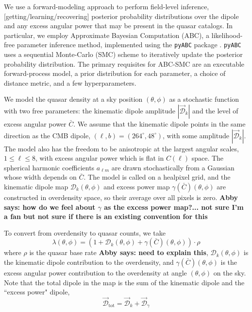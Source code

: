 \documentclass[modern]{aastex631}
\newcommand{\abby}[1]{\textbf{Abby says: #1}}
\newcommand{\dipamp}{|\vec{\mathcal{D}}_k|}
\begin{document}
We use a forward-modeling approach to perform field-level inference, [getting/learning/recovering] posterior probability distributions over the dipole and any excess angular power that may be present in the quasar catalogs.
In particular, we employ Approximate Bayesian Computation (ABC), a likelihood-free parameter inference method, implemented using the \texttt{pyABC} package \citep{schalte_pyabc_2022}.
\texttt{pyABC} uses a sequential Monte-Carlo (SMC) scheme to iteratively update the posterior probability distribution.
The primary requisites for ABC-SMC are an executable forward-process model, a prior distribution for each parameter, a choice of distance metric, and a few hyperparameters.

We model the quasar density at a sky position $(\theta,\phi)$ as a stochastic function with two free parameters: the kinematic dipole amplitude $\dipamp$ and the level of excess angular power $\bar C$.
We assume that the kinematic dipole points in the same direction as the CMB dipole, $(\ell,b)=(264^\circ,48^\circ)$, with some amplitude $|\vec{\mathcal{D}}_k|$.
The model also has the freedom to be anisotropic at the largest angular scales, $1\le\ell\le 8$, with excess angular power which is flat in $C(\ell)$ space.
The spherical harmonic coefficients $a_{\ell m}$ are drawn stochastically from a Gaussian whose width depends on $\bar C$.
The model is called on a healpixel grid, and the kinematic dipole map $\mathcal{D}_k(\theta,\phi)$ and excess power map $\gamma(\bar C)(\theta,\phi)$ are constructed in overdensity space, so their average over all pixels is zero.
\abby{how do we feel about $\gamma$ as the excess power map?... not sure I'm a fan but not sure if there is an existing convention for this}

To convert from overdensity to quasar counts, we take
\begin{equation}
    \lambda(\theta,\phi) = (1 + \mathcal{D}_k(\theta,\phi) + \gamma(\bar C)(\theta, \phi)) \cdot \rho
\end{equation}
where $\rho$ is the quasar base rate \abby{need to explain this}, $\mathcal{D}_k(\theta,\phi)$ is the kinematic dipole contribution to the overdensity, and $\gamma(\bar C)(\theta,\phi)$ is the excess angular power contribution to the overdensity at angle $(\theta,\phi)$ on the sky.
Note that the total dipole in the map is the sum of the kinematic dipole and the ``excess power" dipole,
\begin{equation}
    \vec{\mathcal{D}}_\mathrm{tot}=\vec{\mathcal{D}}_k + \vec{\mathcal{D}}_\gamma 
\end{equation}
\end{document}
